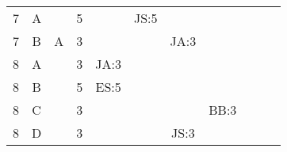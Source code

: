 \documentclass[12pt]{article}
\begin{document}
\begin{table}[H]
\begin{tabular}{@{}c|c|c|c|ccccccc@{}}
7     & A    &            & 5                                                      &                                                 &  JS:5                                           &                                                  &                                                  &                                                  &                                                  &                                                  \\
7     & B    & A          & 3                                                      &                                                 &                                                 & JA:3                                             &                                                  &                                                  &                                                  &                                                  \\
8     & A    &            & 3                                                      & JA:3                                            &                                                 &                                                  &                                                  &                                                  &                                                  &                                                  \\
8     & B    &            & 5                                                      & ES:5                                            &                                                 &                                                  &                                                  &                                                  &                                                  &                                                  \\ 
8     & C    &            & 3                                                      &                                                 &                                                 &                                                  &  BB:3                                            &                                                  &                                                  &                                                  \\ 
8     & D    &            & 3                                                      &                                                 &                                                 & JS:3                                             &                                                  &                                                  &                                                  &                                                  \\ 

\end{tabular}
\end{table}
\end{document}
